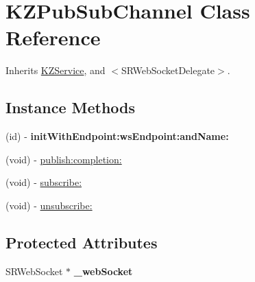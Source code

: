 \hypertarget{interface_k_z_pub_sub_channel}{\section{K\-Z\-Pub\-Sub\-Channel Class Reference}
\label{interface_k_z_pub_sub_channel}
}


Inherits \hyperlink{interface_k_z_service}{K\-Z\-Service}, and $<$\-S\-R\-Web\-Socket\-Delegate$>$.

\subsection*{Instance Methods}
\begin{DoxyCompactItemize}
\item 
\hypertarget{interface_k_z_pub_sub_channel_a8877a162cbd2a78506759eb8e5f5b889}{(id) -\/ {\bfseries init\-With\-Endpoint\-:ws\-Endpoint\-:and\-Name\-:}}\label{interface_k_z_pub_sub_channel_a8877a162cbd2a78506759eb8e5f5b889}

\item 
(void) -\/ \hyperlink{interface_k_z_pub_sub_channel_a59b6d0b327d1823dea95fb41f0a440ab}{publish\-:completion\-:}
\item 
(void) -\/ \hyperlink{interface_k_z_pub_sub_channel_adbd0f82bb90e68b2c141d5a46748387e}{subscribe\-:}
\item 
(void) -\/ \hyperlink{interface_k_z_pub_sub_channel_acbf985f7c72bf2396d4002e68d820b9f}{unsubscribe\-:}
\end{DoxyCompactItemize}
\subsection*{Protected Attributes}
\begin{DoxyCompactItemize}
\item 
\hypertarget{interface_k_z_pub_sub_channel_a9db253e66f8c0fa8724b4a0d1009557e}{S\-R\-Web\-Socket $\ast$ {\bfseries \-\_\-web\-Socket}}\label{interface_k_z_pub_sub_channel_a9db253e66f8c0fa8724b4a0d1009557e}

\end{DoxyCompactItemize}
